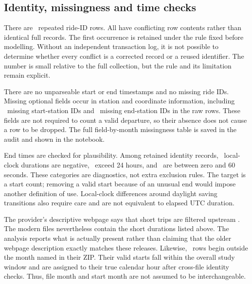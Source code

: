 \documentclass[10pt]{article}
\begin{document}
\subsection{Identity, missingness and time checks}
There are \NDuplicates\ repeated ride-ID rows. All have conflicting row contents rather than identical full records. The first occurrence is retained under the rule fixed before modelling. Without an independent transaction log, it is not possible to determine whether every conflict is a corrected record or a reused identifier. The number is small relative to the full collection, but the rule and its limitation remain explicit.

There are no unparseable start or end timestamps and no missing ride IDs. Missing optional fields occur in station and coordinate information, including \NMissingStartStation\ missing start-station IDs and \NMissingEndStation\ missing end-station IDs in the raw rows. These fields are not required to count a valid departure, so their absence does not cause a row to be dropped. The full field-by-month missingness table is saved in the audit and shown in the notebook.

End times are checked for plausibility. Among retained identity records, \NNegativeDuration\ local-clock durations are negative, \NLongDuration\ exceed 24 hours, and \NShortDuration\ are between zero and 60 seconds. These categories are diagnostics, not extra exclusion rules. The target is a start count; removing a valid start because of an unusual end would impose another definition of use. Local-clock differences around daylight saving transitions also require care and are not equivalent to elapsed UTC duration.

The provider's descriptive webpage says that short trips are filtered upstream \citep{capitaldata}. The modern files nevertheless contain the short durations listed above. The analysis reports what is actually present rather than claiming that the older webpage description exactly matches these releases. Likewise, \NOutsideMonth\ rows begin outside the month named in their ZIP. Their valid starts fall within the overall study window and are assigned to their true calendar hour after cross-file identity checks. Thus, file month and start month are not assumed to be interchangeable.

\begin{table}[t]
\caption{Row accounting. End-time diagnostics do not remove a valid start. The unresolved DST rows are retained separately.}
\label{tab:audit}
\centering

\end{table}
\end{document}
